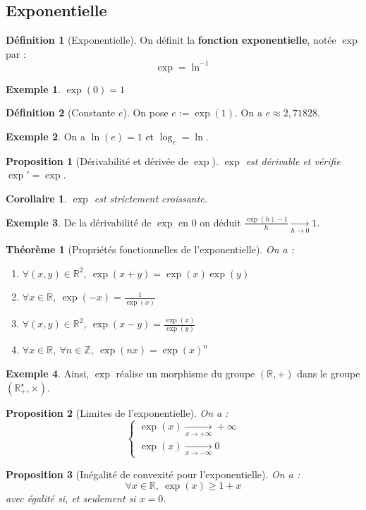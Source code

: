 \documentclass[french]{book}
\newcommand{\Z}{\mathbb{Z}}
\newcommand{\R}{\mathbb{R}}
\newcommand{\st}{^\star}
\newcommand{\inv}{^{-1}}
\theoremstyle{plain}
\newtheorem{thm}{Théorème}[chapter]
\newtheorem{prop}{Proposition}[chapter]
\newtheorem{cor}{Corollaire}[chapter]
\theoremstyle{definition}
\newtheorem{dfn}{Définition}[chapter]
\newtheorem{exa}{Exemple}[chapter]
\theoremstyle{remark}
\begin{document}
\subsection{Exponentielle}
\begin{dfn}[Exponentielle]
	On définit la \textbf{fonction exponentielle}, notée $\exp$ par : $$\exp=\ln\inv$$
\end{dfn}
\begin{exa}
	$\exp(0)=1$
\end{exa}
\begin{dfn}[Constante $e$]
	On pose $e:=\exp(1)$. On a $e\approx 2,71828$.
\end{dfn}
\begin{exa}
	On a $\ln(e)=1$ et $\log_e=\ln$.
\end{exa}
\begin{prop}[Dérivabilité et dérivée de $\exp$]
	$\exp$ est dérivable et vérifie $\exp'=\exp$.
\end{prop}
\begin{cor}
	$\exp$ est strictement croissante.
\end{cor}
\begin{exa}
	De la dérivabilité de $\exp$ en $0$ on déduit $\displaystyle\frac{\exp(h)-1}{h}\xrightarrow[h\to 0]{}1$.
\end{exa}
\begin{thm}[Propriétés fonctionnelles de l'exponentielle]
	On a : 
	\begin{enumerate}
		\item $\forall (x,y)\in\R^2,\ \exp(x+y)=\exp(x)\exp(y)$
		\item $\forall x\in\R,\ \exp(-x)=\displaystyle\frac{1}{\exp(x)}$
		\item $\forall (x,y)\in\R^2,\ \exp(x-y)=\displaystyle\frac{\exp(x)}{\exp(y)}$
		\item $\forall x\in\R,\ \forall n\in\Z,\ \exp(nx)=\exp(x)^n$
	\end{enumerate}
\end{thm}
\begin{exa}
	Ainsi, $\exp$ réalise un morphisme du groupe $(\R,+)$ dans le groupe $(\R_+\st,\times)$.
\end{exa}
\begin{prop}[Limites de l'exponentielle]
	On a : $$\begin{cases}
		\exp(x)\xrightarrow[x\to +\infty]{}+\infty\\
		\exp(x)\xrightarrow[x\to -\infty]{}0
	\end{cases}$$
\end{prop}
\begin{prop}[Inégalité de convexité pour l'exponentielle]
	On a : $$\forall x\in\R,\ \exp(x)\geqslant 1+x$$ avec égalité si, et seulement si $x=0$.
\end{prop}
\end{document}
